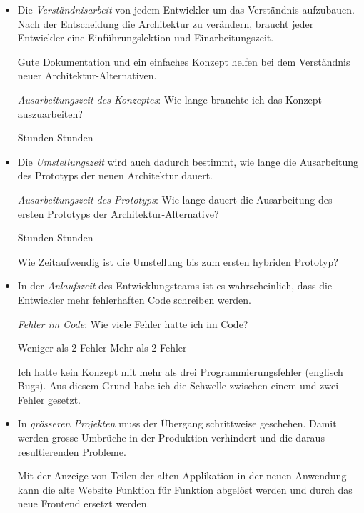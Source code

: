 \begin{itemize}
    \item Die \textit{Verständnisarbeit} von jedem Entwickler um das Verständnis aufzubauen. Nach der Entscheidung die Architektur zu verändern, braucht jeder Entwickler eine Einführungslektion und Einarbeitungszeit.
    
    Gute Dokumentation und ein einfaches Konzept helfen bei dem Verständnis neuer Architektur-Alternativen.
    
    \textit{Ausarbeitungszeit des Konzeptes}:  Wie lange brauchte ich das Konzept auszuarbeiten?
    \begin{itemize}
         Stunden
         Stunden
    \end{itemize}
    
    \item Die \textit{Umstellungszeit} wird auch dadurch bestimmt, wie lange die Ausarbeitung des Prototyps der neuen Architektur dauert.
    
    \textit{Ausarbeitungszeit des Prototyps}:  Wie lange dauert die Ausarbeitung des ersten Prototyps der Architektur-Alternative?
    \begin{itemize}
         Stunden
         Stunden
    \end{itemize}
    
    Wie Zeitaufwendig ist die Umstellung bis zum ersten hybriden Prototyp?
    \item In der \textit{Anlaufszeit} des Entwicklungsteams ist es wahrscheinlich, dass die Entwickler mehr fehlerhaften Code schreiben werden.
    
    \textit{Fehler im Code}: Wie viele Fehler hatte ich im Code?
    \begin{itemize}
        \pro Weniger als 2 Fehler
        \con Mehr als 2 Fehler
    \end{itemize}
    
    Ich hatte kein Konzept mit mehr als drei Programmierungsfehler (englisch Bugs). Aus diesem Grund habe ich die Schwelle zwischen einem und zwei Fehler gesetzt.
    \item In \textit{grösseren Projekten} muss der Übergang schrittweise geschehen. Damit werden grosse Umbrüche in der Produktion verhindert und die daraus resultierenden Probleme.
    
    Mit der Anzeige von Teilen der alten Applikation in der neuen Anwendung kann die alte Website Funktion für Funktion abgelöst werden und durch das neue Frontend ersetzt werden.
    

\end{itemize}
